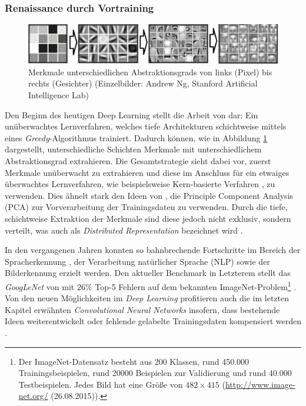 \subsubsection{Renaissance durch Vortraining}
\begin{figure}
\centering
\includegraphics[width=0.95\linewidth]{images/1_Features}
\caption[Merkmale unterschiedlichen Abstraktionsgrads von links (Pixel) bis rechts (Gesichter)]{Merkmale unterschiedlichen Abstraktionsgrads von links (Pixel) bis rechts (Gesichter) (Einzelbilder: Andrew Ng, Stanford Artificial Intelligence Lab)}
\label{fig:1_Features}
\end{figure}
Den Beginn des heutigen Deep Learning stellt die Arbeit von \cite{Hinton2006} dar: Ein unüberwachtes Lernverfahren, welches tiefe Architekturen schichtweise mittels eines \textit{Greedy}-Algorithmus trainiert. Dadurch können, wie in Abbildung \ref{fig:1_Features} dargestellt, unterschiedliche Schichten Merkmale mit unterschiedlichem Abstraktionsgrad extrahieren. Die Gesamtstrategie sieht dabei vor, zuerst Merkmale unüberwacht zu extrahieren und diese im Anschluss für ein etwaiges überwachtes Lernverfahren, wie beispielsweise Kern-basierte Verfahren \cite[vgl.][]{Salakhutdinov2008}, zu verwenden. Dies ähnelt stark den Ideen von \cite{Becker1991}, die Principle Component Analysis (PCA) zur Vorverarbeitung der Trainingsdaten zu verwenden. Durch die tiefe, schichtweise Extraktion der Merkmale sind diese jedoch nicht exklusiv, sondern verteilt, was auch als \textit{Distributed Representation} bezeichnet wird \cite[vgl.][]{Hinton1986}.

In den vergangenen Jahren konnten so bahnbrechende Fortschritte im Bereich der Spracherkennung \cite[vgl][]{Sainatha2015}, der Verarbeitung natürlicher Sprache (NLP) \cite[vgl.][]{Socher2011} sowie  der Bilderkennung erzielt werden. Den aktueller Benchmark in Letzterem stellt das \textit{GoogLeNet} von \cite{Szegedy14} mit $26\%$ Top-5 Fehlern auf dem bekannten ImageNet-Problem\footnote{Der ImageNet-Datensatz besteht aus 200 Klassen, rund 450.000 Trainingsbeispielen, rund 20000 Beispielen zur Validierung und rund 40.000 Testbeispielen. Jedes Bild hat eine Größe von $482 \times 415 $  (\url{http://www.image-net.org/} (26.08.2015)).} \cite[vgl.][]{ImageNet2015}. Von den neuen Möglichkeiten im \textit{Deep Learning} profitieren auch die im letzten Kapitel erwähnten \textit{Convolutional Neural Networks} insofern, dass bestehende Ideen weiterentwickelt oder fehlende gelabelte Trainingsdaten kompensiert werden \cite[vgl.][]{LeRanzato2012}.\\

